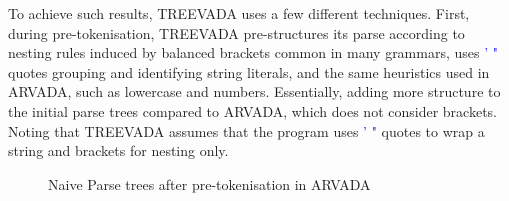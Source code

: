 \vspace{\baselineskip}
To achieve such results, TREEVADA uses a few different techniques. First, during pre-tokenisation, TREEVADA pre-structures its parse according to nesting rules induced by balanced brackets common in many grammars, uses \textcolor{blue}{' "} quotes grouping and identifying string literals, and the same heuristics used in ARVADA, such as lowercase and numbers. Essentially, adding more structure to the initial parse trees compared to ARVADA, which does not consider brackets. Noting that TREEVADA assumes that the program uses \textcolor{blue}{' "} quotes to wrap a string and brackets for nesting only.

\begin{figure}[h!]
\centering
{}
\caption{Naive Parse trees after pre-tokenisation in ARVADA}


\end{figure}
